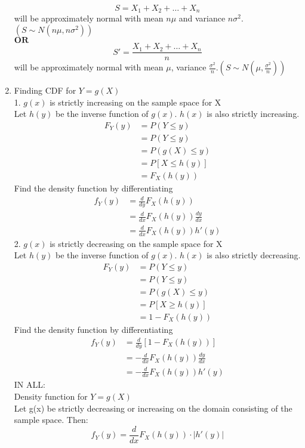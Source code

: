 \documentclass[10pt]{article}
\begin{document}
\begin{multicols}{2}
\begin{enumerate}
			$$ S = X_1 + X_2 + \dots + X_n$$
			will be approximately normal with mean $n\mu$ and variance $n\sigma^2$. $(S\sim N(n\mu, n\sigma^2))$\\
			$\textbf{OR}$\\
			$$S' = \frac{X_1 + X_2 + \dots + X_n}{n}$$
			will be approximately normal with mean $\mu$, variance $\frac{\sigma^2}{n}$.$(S\sim N(\mu, \frac{\sigma^2}{n}))$\\
			\item Finding CDF for $Y = g(X)$\\
			1. $g(x)$ is strictly increasing on the sample space for X\\
			Let $h(y)$ be the inverse function of $g(x)$. $h(x)$ is also strictly increasing.
			\begin{align*}
				F_Y(y) &= P(Y\le y)\\
				&= P(Y\le y)\\
				&= P(g(X) \le y)\\
				&= P[X \le h(y)]\\
				&= F_X(h(y))
			\end{align*}
			Find the density function by differentiating
			\begin{align*}
				f_Y(y) &= \frac{d}{dy}F_X(h(y))\\
				&= \frac{d}{dx}F_X(h(y))\frac{dy}{dx}\\
				&= \frac{d}{dx}F_X(h(y))h'(y)
			\end{align*}
			2. $g(x)$ is strictly decreasing on the sample space for X\\
			Let $h(y)$ be the inverse function of $g(x)$. $h(x)$ is also strictly decreasing.\\
			\begin{align*}
				F_Y(y) &= P(Y\le y)\\
				&= P(Y\le y)\\
				&= P(g(X) \le y)\\
				&= P[X \ge h(y)]\\
				&= 1 - F_X(h(y))
			\end{align*}
			Find the density function by differentiating
			\begin{align*}
				f_Y(y) &= \frac{d}{dy}[1-F_X(h(y))]\\
				&= -\frac{d}{dx}F_X(h(y))\frac{dy}{dx}\\
				&= -\frac{d}{dx}F_X(h(y))h'(y)
			\end{align*}
			IN ALL:\\
			Density function for $Y = g(X)$\\
			Let g(x) be strictly decreasing or increasing on the domain consisting of the sample space. Then:
			$$f_Y(y) = \frac{d}{dx}F_X(h(y)) \cdot |h'(y)|$$
		\end{enumerate}
	\newpage
	\end{multicols}
\end{document}
